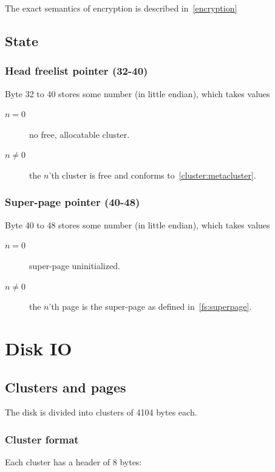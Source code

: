 \documentclass[11pt,a4paper]{report}
\newcommand{\clustersize}{4104 }
\begin{document}
        The exact semantics of encryption is described in~\ref{encryption}

    \section{State}
        \subsection{Head freelist pointer (32-40)}
        Byte 32 to 40 stores some number (in little endian), which takes values

        \begin{description}
            \item [$n = 0$]    no free, allocatable cluster.
            \item [$n \neq 0$] the $n$'th cluster is free and conforms
                to~\ref{cluster:metacluster}.
        \end{description}

        \subsection{Super-page pointer (40-48)}
        Byte 40 to 48 stores some number (in little endian), which takes values

        \begin{description}
            \item [$n = 0$]    super-page uninitialized.
            \item [$n \neq 0$] the $n$'th page is the super-page as
                defined in~\ref{fs:superpage}.
        \end{description}

    \chapter{Disk IO}

    \section{Clusters and pages}
        The disk is divided into clusters of \clustersize bytes each.

        \subsection{Cluster format}
        Each cluster has a header of 8 bytes:
\end{document}
